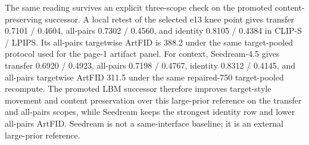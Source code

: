 \documentclass[letterpaper]{article}
\begin{document}
The same reading survives an explicit three-scope check on the promoted content-preserving successor. A local retest of the selected e13 knee point gives transfer 0.7101 / 0.4604, all-pairs 0.7302 / 0.4560, and identity 0.8105 / 0.4384 in CLIP-S / LPIPS. Its all-pairs targetwise ArtFID is 388.2 under the same target-pooled protocol used for the page-1 artifact panel. For context, Seedream-4.5 gives transfer 0.6920 / 0.4923, all-pairs 0.7198 / 0.4767, identity 0.8312 / 0.4145, and all-pairs targetwise ArtFID 311.5 under the same repaired-750 target-pooled recompute. The promoted LBM successor therefore improves target-style movement and content preservation over this large-prior reference on the transfer and all-pairs scopes, while Seedream keeps the strongest identity row and lower all-pairs ArtFID. Seedream is not a same-interface baseline; it is an external large-prior reference.

\begin{table}[t]
\centering
\caption{Auxiliary artifact-sensitive and non-CLIP diagnostics on selected Distinct5-WikiArt rows. tw-ArtFID uses the all-pairs target-pooled recompute; Gram-$\mu$ is a shallow VGG Gram distance; EdgePurity is a higher-is-better content-edge diagnostic; NonCLIPAcc is the transfer-only target accuracy from the held-out ConvNeXt style probe.}
\label{tab:distinct5_artifact_aux}
\small
\setlength{\tabcolsep}{3.4pt}
\end{table}
\end{document}
